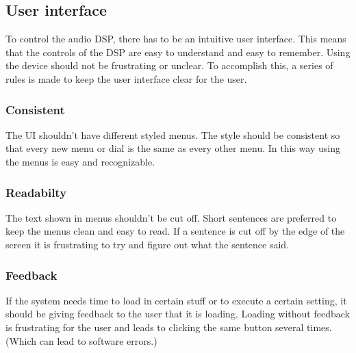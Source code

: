 \subsection{User interface}
To control the audio DSP, there has to be an intuitive user interface. This means that the controls of the DSP are easy to understand and easy to remember. Using the device should not be frustrating or unclear.
To accomplish this,  a series of rules is made to keep the user interface clear for the user.\\

\subsubsection*{Consistent}
The UI shouldn’t have different styled menus. The style should be consistent so that every new menu or dial is the same as every other menu. In this way using the menus is easy and recognizable. \\

\subsubsection*{Readabilty}
The text shown in menus shouldn’t be cut off. Short sentences are preferred to keep the menus clean and easy to read. If a sentence is cut off by the edge of the screen it is frustrating to try and figure out what the sentence said.  \\

\subsubsection*{Feedback}
If the system needs time to load in certain stuff or to execute a certain setting, it should be giving feedback to the user that it is loading. Loading without feedback is frustrating for the user and leads to clicking the same button several times. (Which can lead to software errors.) \\
